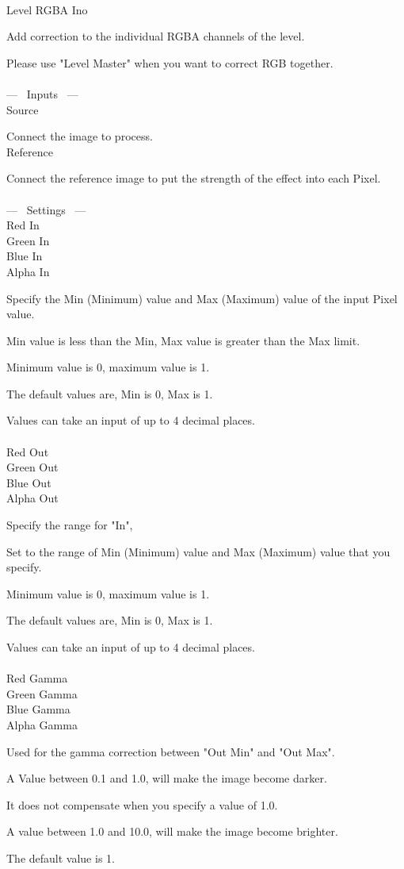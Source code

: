 \documentclass[a4paper,12pt]{article}
\begin{document}
\thispagestyle{empty}

\Large
\noindent \\
Level RGBA Ino\medskip
\par
\normalsize
Add correction to the individual RGBA channels of the level.\par
Please use "Level Master" when you want to correct RGB together.\\
\\
--- \ Inputs \ ---\\
Source\par
Connect the image to process.\\
Reference\par
Connect the reference image to put the strength of the effect into each Pixel.\\
\\
--- \ Settings \ ---\\
Red In\\
Green In\\
Blue In\\
Alpha In\par
Specify the Min (Minimum) value and Max (Maximum) value of the input Pixel value.\par
Min value is less than the Min, Max value is greater than the Max limit.\par
Minimum value is 0, maximum value is 1.\par
The default values are, Min is 0, Max is 1.\par
Values can take an input of up to 4 decimal places.\\
\\
Red Out\\
Green Out\\
Blue Out\\
Alpha Out\par
Specify the range for "In",\par
Set to the range of Min (Minimum) value and Max (Maximum) value that you specify.\par
Minimum value is 0, maximum value is 1.\par
The default values are, Min is 0, Max is 1.\par
Values can take an input of up to 4 decimal places.\\
\\
Red Gamma\\
Green Gamma\\
Blue Gamma\\
Alpha Gamma\par
Used for the gamma correction between "Out Min" and "Out Max".\par
A Value between 0.1 and 1.0, will make the image become darker.\par
It does not compensate when you specify a value of 1.0.\par
A value between 1.0 and 10.0, will make the image become brighter.\par
The default value is 1.
\end{document}
